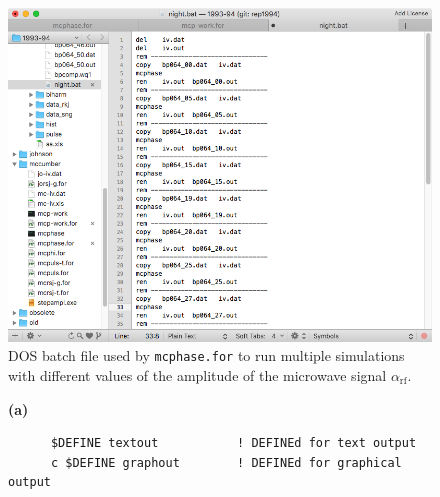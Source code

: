 \begin{supplement}
\begin{figure}[p]
    \centering
    \includegraphics[width = \textwidth]{figures/batch-file.png}
    \caption{DOS batch file used by \texttt{mcphase.for} to run multiple simulations with different values of the amplitude of the microwave signal $\alpha_\mathrm{rf}$.}
    \label{fig:batch-file}
\end{figure}




\begin{figure}[p]
\centering

\begin{minipage}{\textwidth}
\textbf{(a)}
\begin{lstlisting}
      $DEFINE textout			! DEFINEd for text output
      c $DEFINE graphout		! DEFINEd for graphical output
      

\end{lstlisting}
\end{minipage}
\end{figure}
\end{supplement}
